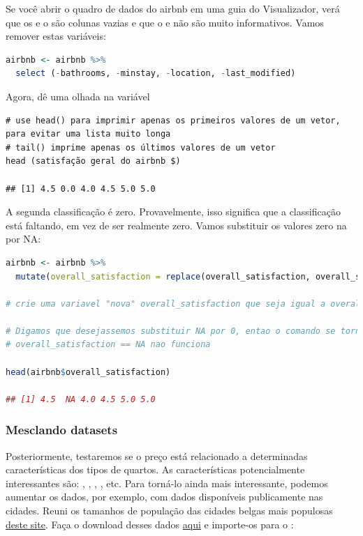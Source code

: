 \documentclass{article}
\begin{document}
Se você abrir o quadro de dados do airbnb em uma guia do Visualizador, verá que os  e o  são colunas vazias e que o  e  não são muito informativos. Vamos remover estas variáveis:

\begin{lstlisting}[language=R]
airbnb <- airbnb %>% 
  select (-bathrooms, -minstay, -location, -last_modified)
\end{lstlisting}

Agora, dê uma olhada na variável 

\begin{lstlisting}
# use head() para imprimir apenas os primeiros valores de um vetor, para evitar uma lista muito longa
# tail() imprime apenas os últimos valores de um vetor
head (satisfação geral do airbnb $)

## [1] 4.5 0.0 4.0 4.5 5.0 5.0
\end{lstlisting}

A segunda classificação é zero. Provavelmente, isso significa que a classificação está faltando, em vez de ser realmente zero. Vamos substituir os valores zero na  por NA:

\begin{lstlisting}[language=R]
airbnb <- airbnb %>% 
  mutate(overall_satisfaction = replace(overall_satisfaction, overall_satisfaction == 0, NA)) 
  
# crie uma variavel "nova" overall_satisfaction que seja igual a overall_satisfaction com valores de NA em que overall_satisfaction seja igual a zero.

# Digamos que desejassemos substituir NA por 0, entao o comando se tornaria: substitute(overall_satisfaction, is.na(overall_satisfaction), 0)
# overall_satisfaction == NA nao funciona

head(airbnb$overall_satisfaction)

## [1] 4.5  NA 4.0 4.5 5.0 5.0
\end{lstlisting}

\newpage
\subsubsection{Mesclando datasets}

Posteriormente, testaremos se o preço está relacionado a determinadas características dos tipos de quartos. As características potencialmente interessantes são: , , , , etc. Para torná-lo ainda mais interessante, podemos aumentar os dados, por exemplo, com dados disponíveis publicamente nas cidades. Reuni os tamanhos de população das cidades belgas mais populosas \href{https://population.mongabay.com/population/belgium/}{deste site}. Faça o download desses dados \href{http://users.telenet.be/samuelfranssens/tutorial_data/population.xlsx}{aqui} e importe-os para o \faRProject:
\end{document}

